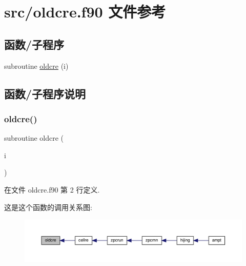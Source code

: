 \hypertarget{oldcre_8f90}{}\section{src/oldcre.f90 文件参考}
\label{oldcre_8f90}
\subsection*{函数/子程序}
\begin{DoxyCompactItemize}
\item 
subroutine \mbox{\hyperlink{oldcre_8f90_a22f0eb47810a5c80081d75680dbc5c58}{oldcre}} (i)
\end{DoxyCompactItemize}


\subsection{函数/子程序说明}
\mbox{\label{oldcre_8f90_a22f0eb47810a5c80081d75680dbc5c58}} 
\subsubsection{\texorpdfstring{oldcre()}{oldcre()}}
{\footnotesize\ttfamily subroutine oldcre (\begin{DoxyParamCaption}\item[{}]{i }\end{DoxyParamCaption})}



在文件 oldcre.\+f90 第 2 行定义.

这是这个函数的调用关系图\+:
\nopagebreak
\begin{figure}[H]
\begin{center}
\leavevmode
\includegraphics[width=350pt]{oldcre_8f90_a22f0eb47810a5c80081d75680dbc5c58_icgraph}
\end{center}
\end{figure}
